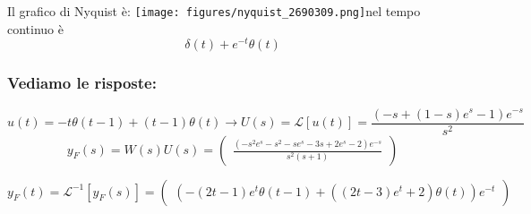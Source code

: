 \documentclass{article}
\begin{document}
Il grafico di Nyquist è:
\texttt{[image: figures/nyquist\_2690309.png]}nel tempo continuo è \[ \delta\left(t\right) + e^{- t} \theta\left(t\right) \]
\subsubsection{Vediamo le risposte:}
\[ u(t) = - t \theta\left(t - 1\right) + \left(t - 1\right) \theta\left(t\right) \to U(s) = \mathcal{L}[u(t)] = \frac{\left(- s + \left(1 - s\right) e^{s} - 1\right) e^{- s}}{s^{2}} \]
\[ y_F(s) = W(s) U(s)  = \left(\begin{matrix}\frac{\left(- s^{2} e^{s} - s^{2} - s e^{s} - 3 s + 2 e^{s} - 2\right) e^{- s}}{s^{2} \left(s + 1\right)}\end{matrix}\right)\] 

\[ y_F(t) = \mathcal{L}^{-1}[y_F(s)] = \left(\begin{matrix}\left(- \left(2 t - 1\right) e^{t} \theta\left(t - 1\right) + \left(\left(2 t - 3\right) e^{t} + 2\right) \theta\left(t\right)\right) e^{- t}\end{matrix}\right) \] 
\end{document}
